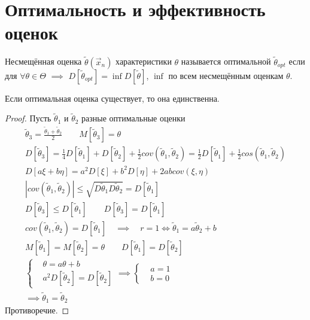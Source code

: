 \documentclass{article}
\begin{document}
\section{Оптимальность и эффективность оценок}
\begin{definition}
  Несмещённая оценка $\tilde{\theta}(\vec{x}_n)$ характеристики $\theta$ называется
  оптимальной $\tilde{\theta}_{opt}$ если для $\forall \theta \in \Theta$ $\implies$
  $D[\tilde{\theta}_{opt}]=\inf D[\tilde{\theta}]$,
  $\inf$ по всем несмещённым оценкам $\theta$.
\end{definition}
\begin{theorem}
  Если оптимальная оценка существует, то она единственна.
\end{theorem}
\begin{proof}
  Пусть $\tilde{\theta}_1$ и $\tilde{\theta}_2$ разные оптимальные оценки
  \begin{gather*}
    \tilde{\theta}_3=\frac{\tilde{\theta}_{1}+\tilde{\theta}_{2}}{2} \qquad M[\tilde{\theta}_{3}]=\theta \\
    D[\tilde{\theta}_{3}]=\frac{1}{4}D[\tilde{\theta}_{1}]+D[\tilde{\theta}_{2}]+\frac{1}{2}cov(\tilde{\theta}_{1},\tilde{\theta}_{2})=
    \frac{1}{2}D[\tilde{\theta}_{1}]+\frac{1}{2}cos(\tilde{\theta}_{1},\tilde{\theta}_{2}) \\ 
    D[a\xi+b\eta]=a^{2}D[\xi]+b^{2}D[\eta]+2abcov(\xi,\eta) \\ 
    |cov(\tilde{\theta}_{1},\tilde{\theta}_{2})|\le \sqrt{D \tilde{\theta}_{1} D \tilde{\theta}_{2}}=D[\tilde{\theta}_{1}] \\
    D[\tilde{\theta}_{3}]\le D[\tilde{\theta}_{1}] \qquad D[\tilde{\theta}_{3}]=D[\tilde{\theta}_{1}] \\ 
    cov(\tilde{\theta}_{1},\tilde{\theta}_{2})=D[\tilde{\theta}_{1}] \quad \implies \quad r=1 \iff \tilde{\theta}_{1}=a \tilde{\theta}_{2}+b \\ 
    M[\tilde{\theta}_{1}]=M[\tilde{\theta}_{2}]=\theta \qquad D[\tilde{\theta}_{1}]=D[\tilde{\theta}_{2}] \\ 
    \left\{\begin{aligned}
      & \theta=a\theta+b \\ 
      & a^{2}D[\tilde{\theta}_{2}]=D[\tilde{\theta}_{2}]
    \end{aligned}\right. \implies 
    \left\{\begin{aligned}
      & a = 1 \\ 
      & b=0
    \end{aligned}\right. \\
    \implies \tilde{\theta}_{1}=\tilde{\theta}_{2}
  \end{gather*}
  Противоречие.
\end{proof}
\end{document}
